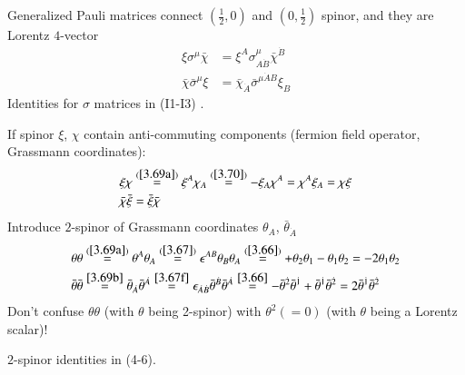 Generalized Pauli matrices connect $(\frac{1}{2}, 0)$ and $(0, \frac{1}{2})$ spinor, and they are Lorentz $4$-vector
\begin{subequations}
  \label{3.71}
  \begin{align}
     \xi \sigma^\mu \bar\chi &= \xi^A \sigma^\mu_{A \dot{B}} \bar\chi^{\dot{B}} \label{3.71a} \\
     \bar\chi \bar\sigma^{\mu} \xi &=  \bar\chi_{\dot A} \bar \sigma^{\mu \dot{A} B} \xi_B \label{3.71b}
  \end{align} 
\end{subequations}
Identities for $\sigma$ matrices in \cite{drees_id} (I1-I3) .

If spinor $\xi$, $\chi$ contain anti-commuting components (fermion field operator, Grassmann coordinates):
\begin{subequations}\label{3.72}
   \begin{align}
      \xi \chi &\stackrel{(\ref{3.69a})}{=} \xi^A \chi_A \stackrel{(\ref{3.70})}{=} - \xi_A \chi^A = \chi^A \xi_A = \chi\xi \label{3.72a} \\
      \bar \chi \bar \xi &= \bar \xi \bar\chi \label{3.72b}
   \end{align}
\end{subequations}
Introduce $2$-spinor of Grassmann coordinates $\theta_A$, $\bar \theta_{\dot{A}}$
\begin{subequations}
  \label{3.73}
  \begin{align}
     \theta \theta &\stackrel{(\ref{3.69a})}{=} \theta^A \theta_A \stackrel{(\ref{3.67})}{=} \epsilon^{AB} \theta_B \theta_A \stackrel{(\ref{3.66})}{=} +\theta_2 \theta_1 - \theta_1 \theta_2 = -2 \theta_1 \theta_2 \label{3.73a}\\
     \bar\theta \bar\theta &\stackrel{\eqref{3.69b}}{=} \bar \theta_{\dot{A}} \bar\theta^{\dot{A}} \stackrel{\eqref{3.67f}}{=} \epsilon_{\dot{A}\dot{B}} \bar\theta^{\dot{B}}\bar\theta^{\dot{A}} \stackrel{\eqref{3.66}}{=} -\bar\theta^{\dot{2}} \bar\theta^{\dot{1}} +\bar \theta^{\dot{1}} \bar\theta^{\dot{2}} = 2 \bar{\theta}^{\dot{1}} \bar \theta^{\dot{2}}\label{3.73b}
  \end{align} 
\end{subequations}
Don't confuse $\theta \theta$ (with $\theta$ being 2-spinor) with $\theta^2 (=0)$ (with $\theta$ being a Lorentz scalar)!

$2$-spinor identities in \cite{drees_id} (4-6).


